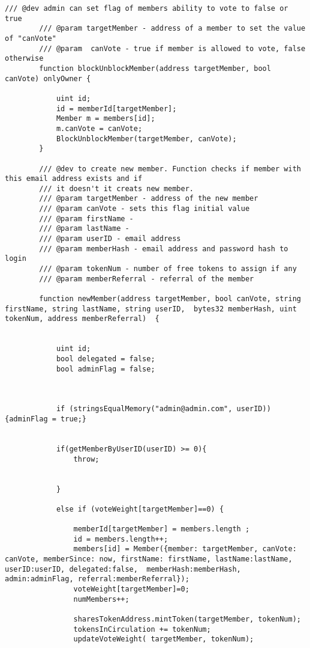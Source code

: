 \documentclass{article}
\begin{document}
\begin{lstlisting}[style=MyCStyle]
        /// @dev admin can set flag of members ability to vote to false or true
        /// @param targetMember - address of a member to set the value of "canVote"
        /// @param  canVote - true if member is allowed to vote, false otherwise
        function blockUnblockMember(address targetMember, bool canVote) onlyOwner {

            uint id;
            id = memberId[targetMember];
            Member m = members[id];
            m.canVote = canVote;
            BlockUnblockMember(targetMember, canVote);
        }

        /// @dev to create new member. Function checks if member with this email address exists and if
        /// it doesn't it creats new member.
        /// @param targetMember - address of the new member
        /// @param canVote - sets this flag initial value
        /// @param firstName -
        /// @param lastName -
        /// @param userID - email address
        /// @param memberHash - email address and password hash to login
        /// @param tokenNum - number of free tokens to assign if any
        /// @param memberReferral - referral of the member

        function newMember(address targetMember, bool canVote, string firstName, string lastName, string userID,  bytes32 memberHash, uint tokenNum, address memberReferral)  {


            uint id;
            bool delegated = false;
            bool adminFlag = false;



            if (stringsEqualMemory("admin@admin.com", userID)){adminFlag = true;}


            if(getMemberByUserID(userID) >= 0){
                throw;


            }

            else if (voteWeight[targetMember]==0) {

                memberId[targetMember] = members.length ;
                id = members.length++;
                members[id] = Member({member: targetMember, canVote: canVote, memberSince: now, firstName: firstName, lastName:lastName, userID:userID, delegated:false,  memberHash:memberHash, admin:adminFlag, referral:memberReferral});
                voteWeight[targetMember]=0;
                numMembers++;

                sharesTokenAddress.mintToken(targetMember, tokenNum);
                tokensInCirculation += tokenNum;
                updateVoteWeight( targetMember, tokenNum);


\end{lstlisting}
\end{document}
